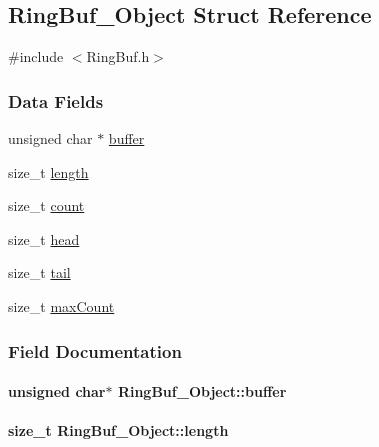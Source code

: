 \subsection{Ring\+Buf\+\_\+\+Object Struct Reference}
\label{struct_ring_buf___object}


{\ttfamily \#include $<$Ring\+Buf.\+h$>$}

\subsubsection*{Data Fields}
\begin{DoxyCompactItemize}
\item 
unsigned char $\ast$ \hyperlink{struct_ring_buf___object_a3aabec3f4cf04dbc4083548e830d8f5e}{buffer}
\item 
size\+\_\+t \hyperlink{struct_ring_buf___object_ac7102de5f975cd743e9618625f6028c4}{length}
\item 
size\+\_\+t \hyperlink{struct_ring_buf___object_ae0c8cf16fcfb34570c11db5f5af7aaf0}{count}
\item 
size\+\_\+t \hyperlink{struct_ring_buf___object_a39b92dd09345c4799adf2de4920af5e3}{head}
\item 
size\+\_\+t \hyperlink{struct_ring_buf___object_ab792bbd6ff48d13ae09eedc33bb79289}{tail}
\item 
size\+\_\+t \hyperlink{struct_ring_buf___object_afdea48daa7a86ad212139842569b8a3f}{max\+Count}
\end{DoxyCompactItemize}


\subsubsection{Field Documentation}
\paragraph[{buffer}]{\setlength{\rightskip}{0pt plus 5cm}unsigned char$\ast$ Ring\+Buf\+\_\+\+Object\+::buffer}\label{struct_ring_buf___object_a3aabec3f4cf04dbc4083548e830d8f5e}
\paragraph[{length}]{\setlength{\rightskip}{0pt plus 5cm}size\+\_\+t Ring\+Buf\+\_\+\+Object\+::length}\label{struct_ring_buf___object_ac7102de5f975cd743e9618625f6028c4}
